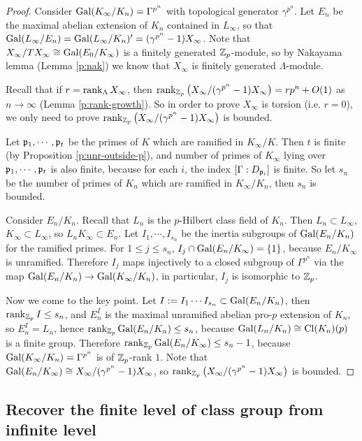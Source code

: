 \begin{proof}
Consider ${\mathrm{Gal}}(K_\infty/K_n)=\Gamma^{p^n}$ with topological generator
$\gamma^{p^n}$. Let $E_n$ be the maximal abelian extension of $K_n$
contained in $L_\infty$, so that ${\mathrm{Gal}}(L_\infty/E_n)={\mathrm{Gal}}(L_\infty/K_n)'
=(\gamma^{p^n}-1)X_\infty$. Note that $X_\infty/TX_\infty\cong{\mathrm{Gal}}(E_0/K_\infty)$
is a finitely generated ${\mathbb {Z}}_p$-module, so by Nakayama lemma
(Lemma \ref{p:nak}) we know that $X_\infty$ is finitely generated $\Lambda$-module.

Recall that if $r=\operatorname{rank}_\Lambda X_\infty$, then
$\operatorname{rank}_{{\mathbb {Z}}_p}\left(X_\infty/(\gamma^{p^n}-1)X_\infty\right)=rp^n+O(1)$
as $n\to\infty$ (Lemma \ref{p:rank-growth}). So in order to prove
$X_\infty$ is torsion (i.e. $r=0$), we only need to prove
$\operatorname{rank}_{{\mathbb {Z}}_p}\left(X_\infty/(\gamma^{p^n}-1)X_\infty\right)$ is bounded.

Let ${\mathfrak{p}}_1,\cdots,{\mathfrak{p}}_t$ be the primes of $K$ which are ramified in $K_\infty/K$.
Then $t$ is finite (by Proposition \ref{p:unr-outside-p}),
and number of primes of $K_\infty$ lying over ${\mathfrak{p}}_1,\cdots,{\mathfrak{p}}_t$
is also finite, because for each $i$, the index $[\Gamma:D_{{\mathfrak{p}}_i}]$
is finite. So let $s_n$ be the number of primes of $K_n$ which are
ramified in $K_\infty/K_n$, then $s_n$ is bounded.

Consider $E_n/K_n$. Recall that $L_n$ is the $p$-Hilbert class field
of $K_n$. Then $L_n\subset L_\infty$, $K_\infty\subset L_\infty$,
so $L_nK_\infty\subset E_n$. Let $I_1,\cdots,I_{s_n}$ be the inertia
subgroups of ${\mathrm{Gal}}(E_n/K_n)$ for the ramified primes.
For $1\leq j\leq s_n$, $I_j\cap{\mathrm{Gal}}(E_n/K_\infty)=\{1\}$,
because $E_n/K_\infty$ is unramified. Therefore $I_j$ maps injectively
to a closed subgroup of $\Gamma^{p^n}$
via the map ${\mathrm{Gal}}(E_n/K_n)\to{\mathrm{Gal}}(K_\infty/K_n)$,
in particular, $I_j$ is isomorphic to ${\mathbb {Z}}_p$.

Now we come to the key point. Let $I:=I_1\cdots I_{s_n}\subset{\mathrm{Gal}}(E_n/K_n)$,
then $\operatorname{rank}_{{\mathbb {Z}}_p}I\leq s_n$, and $E_n^I$ is the maximal
unramified abelian pro-$p$ extension of $K_n$, so $E_n^I=L_n$,
hence $\operatorname{rank}_{{\mathbb {Z}}_p}{\mathrm{Gal}}(E_n/K_n)\leq s_n$,
because ${\mathrm{Gal}}(L_n/K_n)\cong{\mathrm{Cl}}(K_n)(p)$ is a finite group.
Therefore $\operatorname{rank}_{{\mathbb {Z}}_p}{\mathrm{Gal}}(E_n/K_\infty)\leq s_n-1$,
because ${\mathrm{Gal}}(K_\infty/K_n)=\Gamma^{p^n}$ is of ${\mathbb {Z}}_p$-rank $1$.
Note that ${\mathrm{Gal}}(E_n/K_\infty)\cong X_\infty/(\gamma^{p^n}-1)X_\infty$,
so $\operatorname{rank}_{{\mathbb {Z}}_p}\left(X_\infty/(\gamma^{p^n}-1)X_\infty\right)$ is bounded.
\end{proof}

\subsection{Recover the finite level of class group from infinite level}

